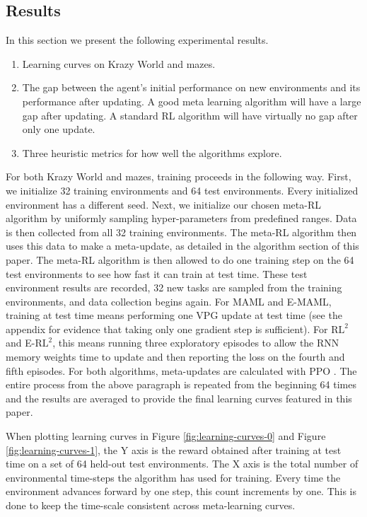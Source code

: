 \documentclass{article} %
\begin{document}
    
\subsection{Results} 
In this section we present the following experimental results. 
\begin{enumerate} 
\item Learning curves on Krazy World and mazes.
\item The gap between the agent's initial performance on new environments and its performance after updating. A good meta learning algorithm will have a large gap after updating. A standard RL algorithm will have virtually no gap after only one update. 
\item Three heuristic metrics for how well the algorithms explore. 
\end{enumerate}


For both Krazy World and mazes, training proceeds in the following way. First, we initialize 32 training environments and 64 test environments. Every initialized environment has a different seed. Next, we initialize our chosen meta-RL algorithm by uniformly sampling hyper-parameters from predefined ranges. Data is then collected from all 32 training environments. The meta-RL algorithm then uses this data to make a meta-update, as detailed in the algorithm section of this paper. The meta-RL algorithm is then allowed to do one training step on the 64 test environments to see how fast it can train at test time. These test environment results are recorded, 32 new tasks are sampled from the training environments, and data collection begins again. For MAML and E-MAML, training at test time means performing one VPG update at test time (see the appendix for evidence that taking only one gradient step is sufficient). For $\text{RL}^2$ and E-$\text{RL}^2$, this means running three exploratory episodes to allow the RNN memory weights time to update and then reporting the loss on the fourth and fifth episodes. For both algorithms, meta-updates are calculated with PPO \cite{ppo}. The entire process from the above paragraph is repeated from the beginning 64 times and the results are averaged to provide the final learning curves featured in this paper. 

When plotting learning curves in Figure  \ref{fig:learning-curves-0} and Figure \ref{fig:learning-curves-1}, the Y axis is the reward obtained after training at test time on a set of 64 held-out test environments. The X axis is the total number of environmental time-steps the algorithm has used for training. Every time the environment advances forward by one step, this count increments by one. This is done to keep the time-scale consistent across meta-learning curves.  
\end{document}
